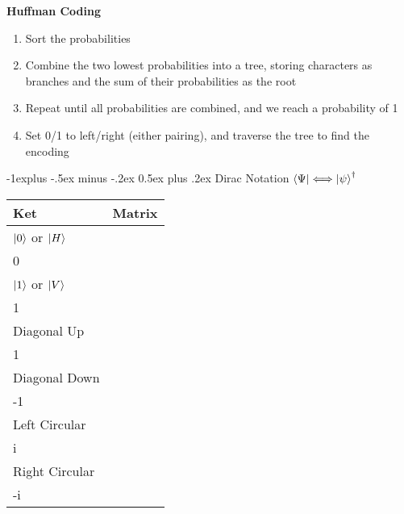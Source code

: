 \documentclass[letterpaper, 8pt]{extarticle}
\makeatletter
\renewcommand{\section}{\@startsection{section}{1}{0mm}%
                                {-1explus -.5ex minus -.2ex}%
                                {0.5ex plus .2ex}%
                                {\normalfont\normalsize\bfseries}}
\makeatother
\begin{document}
\begin{multicols*}{5}
    \textbf{Huffman Coding}
    \begin{enumerate}
        \item Sort the probabilities
        \item Combine the two lowest probabilities into a tree,
              storing characters as branches and the sum of their probabilities as the root
        \item Repeat until all probabilities are combined, and we reach a probability of 1
        \item Set 0/1 to left/right (either pairing), and traverse the tree to find the encoding
    \end{enumerate}

    \section{Dirac Notation}
    \(\bra{\Psi} \Longleftrightarrow \ket{\psi}^\dagger\)

    \begin{tabular}{@{}lc@{}}\toprule
        Ket                        & Matrix                                                      \\ \midrule
        \(\ket{0}\) or \(\ket{H}\) & \(\begin{bmatrix} 1 \\ 0 \end{bmatrix}\)                    \\
        \(\ket{1}\) or \(\ket{V}\) & \(\begin{bmatrix} 0 \\ 1 \end{bmatrix}\)                    \\
        Diagonal Up                & \(\frac{1}{\sqrt{2}}\begin{bmatrix} 1 \\ 1 \end{bmatrix}\)  \\
        Diagonal Down              & \(\frac{1}{\sqrt{2}}\begin{bmatrix} 1 \\ -1 \end{bmatrix}\) \\
        Left Circular              & \(\frac{1}{\sqrt{2}}\begin{bmatrix} 1 \\ i \end{bmatrix}\)  \\
        Right Circular             & \(\frac{1}{\sqrt{2}}\begin{bmatrix} 1 \\ -i \end{bmatrix}\) \\
        \bottomrule
    \end{tabular}


\end{multicols*}
\end{document}
